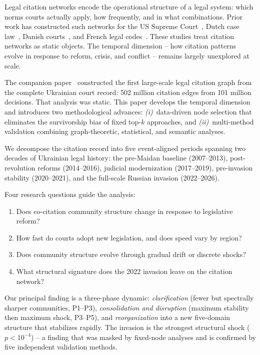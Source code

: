 \documentclass[11pt]{article}
\begin{document}
Legal citation networks encode the operational structure of a legal system: which norms courts actually apply, how frequently, and in what combinations.
Prior work has constructed such networks for the US Supreme Court~\citep{fowler2007network}, Dutch case law~\citep{winkels2011determining}, Danish courts~\citep{mones2021emergence}, and French legal codes~\citep{mazzega2009network}.
These studies treat citation networks as static objects.
The temporal dimension -- how citation patterns evolve in response to reform, crisis, and conflict -- remains largely unexplored at scale.

The companion paper~\citep{ovcharov2026citationgraph} constructed the first large-scale legal citation graph from the complete Ukrainian court record: 502 million citation edges from 101 million decisions.
That analysis was static.
This paper develops the temporal dimension and introduces two methodological advances: \emph{(i)}~data-driven node selection that eliminates the survivorship bias of fixed top-$k$ approaches, and \emph{(ii)}~multi-method validation combining graph-theoretic, statistical, and semantic analyses.

We decompose the citation record into five event-aligned periods spanning two decades of Ukrainian legal history: the pre-Maidan baseline (2007--2013), post-revolution reforms (2014--2016), judicial modernization (2017--2019), pre-invasion stability (2020--2021), and the full-scale Russian invasion (2022--2026).

Four research questions guide the analysis:
\begin{enumerate}[nosep]
  \item[\textbf{RQ1}:] Does co-citation community structure change in response to legislative reform?
  \item[\textbf{RQ2}:] How fast do courts adopt new legislation, and does speed vary by region?
  \item[\textbf{RQ3}:] Does community structure evolve through gradual drift or discrete shocks?
  \item[\textbf{RQ4}:] What structural signature does the 2022 invasion leave on the citation network?
\end{enumerate}

Our principal finding is a three-phase dynamic: \emph{clarification} (fewer but spectrally sharper communities, P1--P3), \emph{consolidation and disruption} (maximum stability then maximum shock, P3--P5), and \emph{reorganization} into a new five-domain structure that stabilizes rapidly.
The invasion is the strongest structural shock ($p < 10^{-4}$) -- a finding that was masked by fixed-node analyses and is confirmed by five independent validation methods.
\end{document}
